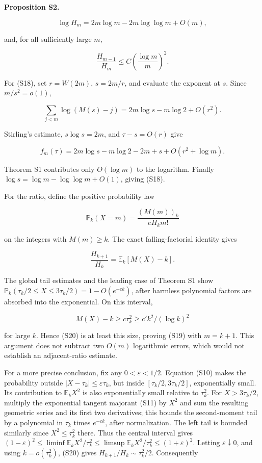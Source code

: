 \textbf{Proposition S2.}

\[
 \log H_m=2m\log m-2m\log\log m+O(m), \tag{S18}
\]

and, for all sufficiently large \(m\),

\[
 \frac{H_{m-1}}{H_m}\le C\left(\frac{\log m}{m}\right)^2. \tag{S19}
\]

For (S18), set \(r=W(2m)\), \(s=2m/r\), and evaluate the exponent at
\(s\). Since \(m/s^2=o(1)\),

\[
 \sum_{j<m}\log(M(s)-j)=2m\log s-m\log2+O(r^2).
\]

Stirling's estimate, \(s\log s=2m\), and \(\tau-s=O(r)\) give

\[
 f_m(\tau)=2m\log s-m\log2-2m+s+O(r^2+\log m).
\]

Theorem S1 contributes only \(O(\log m)\) to the logarithm. Finally
\(\log s=\log m-\log\log m+O(1)\), giving (S18).

For the ratio, define the positive probability law

\[
 \mathbb P_k(X=m)=\frac{(M(m))_k}{eH_k m!}
\]

on the integers with \(M(m)\ge k\). The exact falling-factorial identity
gives

\[
 \frac{H_{k+1}}{H_k}=\mathbb E_k[M(X)-k]. \tag{S20}
\]

The global tail estimates and the leading case of Theorem S1 show
\(\mathbb P_k(\tau_k/2\le X\le3\tau_k/2)=1-O(e^{-c k})\), after harmless
polynomial factors are absorbed into the exponential. On this interval,

\[
 M(X)-k\ge c\tau_k^2\ge c'k^2/(\log k)^2
\]

for large \(k\). Hence (S20) is at least this size, proving (S19) with
\(m=k+1\). This argument does not subtract two \(O(m)\) logarithmic
errors, which would not establish an adjacent-ratio estimate.

For a more precise conclusion, fix any \(0<\varepsilon<1/2\). Equation
(S10) makes the probability outside \(|X-\tau_k|\le\varepsilon\tau_k\),
but inside \([\tau_k/2,3\tau_k/2]\), exponentially small. Its
contribution to \(\mathbb E_k X^2\) is also exponentially small relative
to \(\tau_k^2\). For \(X>3\tau_k/2\), multiply the exponential tangent
majorant (S11) by \(X^2\) and sum the resulting geometric series and its
first two derivatives; this bounds the second-moment tail by a
polynomial in \(\tau_k\) times \(e^{-ck}\), after normalization. The
left tail is bounded similarly since \(X^2\le\tau_k^2\) there. Thus the
central interval gives
\((1-\varepsilon)^2\le\liminf\mathbb E_kX^2/\tau_k^2\le\limsup\mathbb E_kX^2/\tau_k^2\le(1+\varepsilon)^2\).
Letting \(\varepsilon\downarrow0\), and using \(k=o(\tau_k^2)\), (S20)
gives \(H_{k+1}/H_k\sim\tau_k^2/2\). Consequently

